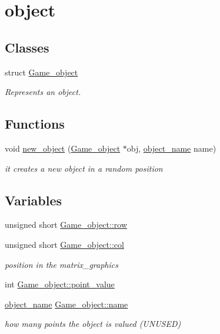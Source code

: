 \hypertarget{group__object}{}\section{object}
\label{group__object}
\subsection*{Classes}
\begin{DoxyCompactItemize}
\item 
struct \hyperlink{structGame__object}{Game\+\_\+object}
\begin{DoxyCompactList}\small\item\em Represents an object. \end{DoxyCompactList}\end{DoxyCompactItemize}
\subsection*{Functions}
\begin{DoxyCompactItemize}
\item 
void \hyperlink{group__object_gaec22a837ae65e3ba7f3e55ad9c37c91d}{new\+\_\+object} (\hyperlink{structGame__object}{Game\+\_\+object} $\ast$obj, \hyperlink{group__object_ga90ab20efa1890ce46e743d7569ce7cec}{object\+\_\+name} name)
\begin{DoxyCompactList}\small\item\em it creates a new object in a random position \end{DoxyCompactList}\end{DoxyCompactItemize}
\subsection*{Variables}
\begin{DoxyCompactItemize}
\item 
unsigned short \hyperlink{group__object_ga41a0b70059db5a8364cb00caed5f7860}{Game\+\_\+object\+::row}
\item 
unsigned short \hyperlink{group__object_ga26747c58af9aac0a386f3be5b5302d23}{Game\+\_\+object\+::col}
\begin{DoxyCompactList}\small\item\em position in the matrix\+\_\+graphics \end{DoxyCompactList}\item 
int \hyperlink{group__object_gaa3e8af9c364161ddf47359bba651e9cf}{Game\+\_\+object\+::point\+\_\+value}
\item 
\hyperlink{group__object_ga90ab20efa1890ce46e743d7569ce7cec}{object\+\_\+name} \hyperlink{group__object_ga27d8ddc2e36ab28af25f9698f1b11e49}{Game\+\_\+object\+::name}
\begin{DoxyCompactList}\small\item\em how many points the object is valued (U\+N\+U\+S\+ED) \end{DoxyCompactList}\end{DoxyCompactItemize}
